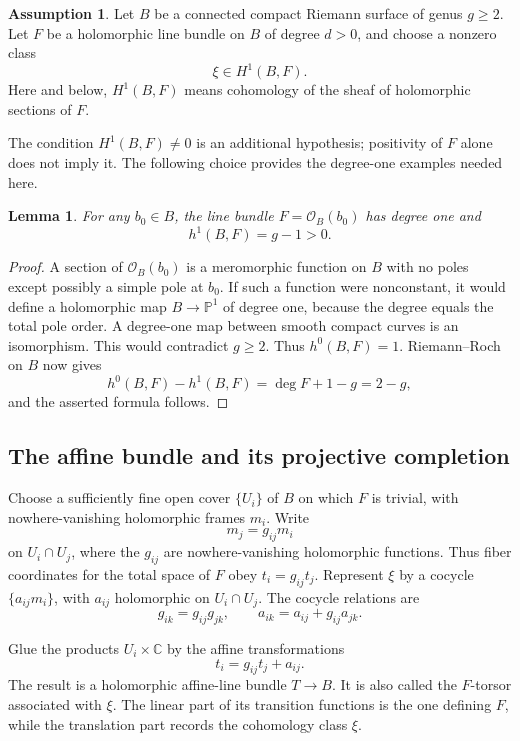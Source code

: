 \documentclass[11pt,a4paper]{article}
\numberwithin{equation}{section}
\newtheorem{lemma}[theorem]{Lemma}
\theoremstyle{definition}
\newtheorem{assumption}[theorem]{Assumption}
\theoremstyle{remark}
\newcommand{\C}{\mathbb C}
\renewcommand{\P}{\mathbb P}
\newcommand{\OO}{\mathcal O}
\begin{document}
\begin{assumption}\label{geo:data}
Let $B$ be a connected compact Riemann surface of genus $g\geq 2$.
Let $F$ be a holomorphic line bundle on $B$ of degree $d>0$, and choose
a nonzero class
\[
  \xi\in H^1(B,F).
\]
Here and below, $H^1(B,F)$ means cohomology of the sheaf of holomorphic
sections of $F$.
\end{assumption}

The condition $H^1(B,F)\ne 0$ is an additional hypothesis; positivity
of $F$ alone does not imply it.  The following choice provides the
degree-one examples needed here.

\begin{lemma}\label{geo:degree-one-choice}
For any $b_0\in B$, the line bundle $F=\OO_B(b_0)$ has degree one and
\[
  h^1(B,F)=g-1>0.
\]
\end{lemma}

\begin{proof}
A section of $\OO_B(b_0)$ is a meromorphic function on $B$ with no
poles except possibly a simple pole at $b_0$.  If such a function were
nonconstant, it would define a holomorphic map $B\to\P^1$ of degree
one, because the degree equals the total pole order.  A degree-one
map between smooth compact curves is an isomorphism.  This would
contradict $g\geq2$.  Thus $h^0(B,F)=1$.  Riemann--Roch on $B$ now
gives
\[
  h^0(B,F)-h^1(B,F)=\deg F+1-g=2-g,
\]
and the asserted formula follows.
\end{proof}

\subsection{The affine bundle and its projective completion}

Choose a sufficiently fine open cover $\{U_i\}$ of $B$ on which $F$
is trivial, with nowhere-vanishing holomorphic frames $m_i$.  Write
\[
  m_j=g_{ij}m_i
\]
on $U_i\cap U_j$, where the $g_{ij}$ are nowhere-vanishing holomorphic
functions.  Thus fiber coordinates for the total space of $F$ obey
$t_i=g_{ij}t_j$.  Represent $\xi$ by a cocycle
$\{a_{ij}m_i\}$, with $a_{ij}$ holomorphic on $U_i\cap U_j$.  The
cocycle relations are
\begin{equation}\label{geo:cocycle-relations}
  g_{ik}=g_{ij}g_{jk},\qquad
  a_{ik}=a_{ij}+g_{ij}a_{jk}.
\end{equation}

Glue the products $U_i\times\C$ by the affine transformations
\begin{equation}\label{geo:affine-transition}
  t_i=g_{ij}t_j+a_{ij}.
\end{equation}
The result is a holomorphic affine-line bundle $T\to B$.  It is also
called the $F$-torsor associated with $\xi$.  The linear part of its
transition functions is the one defining $F$, while the translation
part records the cohomology class $\xi$.
\end{document}
